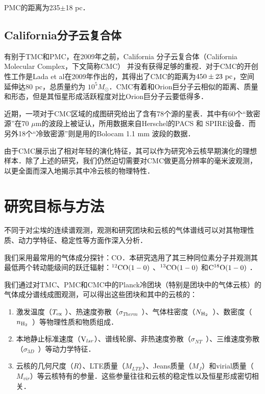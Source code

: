 \documentclass[UTF8, nocolorlinks]{pkuthss}
\newcommand{\coaa}{$\rm^{12}CO(1-0)$ }
\newcommand{\cobb}{$\rm^{13}CO(1-0)$ }
\newcommand{\cocc}{$\rm C^{18}O(1-0)$ }
\newcommand{\vlsr}{${\rm V } _{lsr}$}
\newcommand{\texc}{$T_{\rm {ex}}$ }
\newcommand{\nhyd}{$N_{\rm H_2}$\ }
\newcommand{\nnhyd}{$n_{\rm H_2}$\ }
\newcommand{\sigmath}{$\sigma _{Therm}$\ }
\newcommand{\sigmant}{$\sigma _{NT}$\ }
\newcommand{\sigmatd}{$\sigma _{3D}$\ }
\begin{document}
			PMC的距离为235$\pm$18 pc\supercite{2010A&A...512A..67L}．

		\subsection{California分子云复合体}

			有别于TMC和PMC，在2009年之前，California 分子云复合体（California Molecular Complex，下文简称CMC） 并没有获得足够的重视．对于CMC的开创性工作是Lada et al在2009年作出的，其得出了CMC的距离为$450\pm23\rm\ pc$，空间延伸达80 pc，总质量约为 $10^5 M_\odot$\supercite{2009ApJ...703...52L}．CMC有着和Orion巨分子云相似的距离、质量和形态，但是其恒星形成活跃程度对比Orion巨分子云要低得多\supercite{2009ApJ...703...52L,2010A&A...512A..67L}．

			近期，一项对于CMC区域的成图研究给出了含有78个源的星表\supercite{2013ApJ...764..133H}．其中有60个“致密源”在70 $\mu$m的波段上被证认，所用数据来自Herschel的PACS 和 SPIRE设备\supercite{2013ApJ...764..133H}．而另外18个“冷致密源”则是用的Bolocam 1.1 mm 波段的数据\supercite{2013ApJ...764..133H}．

			由于CMC展示出了相对年轻的演化特征，其可以作为研究冷云核早期演化的理想样本．除了上述的研究，我们仍然迫切需要对CMC做更高分辨率的毫米波观测，以更全面而深入地揭示其中冷云核的物理特性．

	\section{研究目标与方法}

		不同于对尘埃的连续谱观测，观测和研究团块和云核的气体谱线可以对其物理性质、动力学特征、稳定性等方面作深入分析．

		我们采用最常用的气体成分探针：CO．本研究选用了其三种同位素分子并观测其最低两个转动能级间的跃迁辐射：\coaa 、\cobb  和\cocc ．

		我们通过对TMC、PMC和CMC中的Planck冷团块（特别是团块中的气体云核）的气体成分谱线成图观测，可以得出这些团块和其中的云核的：

		\begin{enumerate}
			\item 激发温度（\texc ）、热速度弥散（\sigmath ）、气体柱密度（\nhyd ）、数密度（\nnhyd ）等物理性质和物质组成．

			\item 本地静止标准速度（\vlsr ）、谱线轮廓、非热速度弥散（\sigmant ）、三维速度弥散（\sigmatd ）等动力学特征．

			\item 云核的几何尺度（$R$）、LTE质量（$M_{LTE}$）、Jeans质量（$M_{J}$）和virial质量（$M_{vir}$）等云核特有的参量．这些参量往往和云核的稳定性以及恒星形成密切相关．
		\end{enumerate}
		
\end{document}
